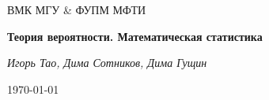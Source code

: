 \documentclass[../TV&MS.tex]{subfiles}
\begin{document}
\begin{titlepage}
	\centering
	{\scshape\LARGE ВМК МГУ \& ФУПМ МФТИ \par}
	\vspace{2.5cm}
	{\huge\bfseries Теория вероятности. Математическая статистика\par}
	\vspace{2cm}
	{\Large\itshape Игорь Тао, Дима Сотников, Дима Гущин\par}
	\vfill

	{\large \today\par}
\end{titlepage}
\end{document}

